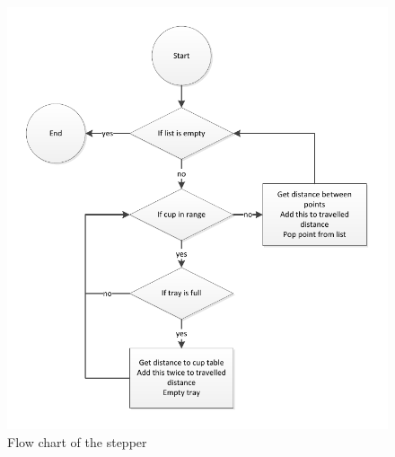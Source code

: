 \begin{figure}[htb]
	\centering
	\includegraphics[width=\textwidth,trim=0 0 0 0]{graphics/flowchart.pdf}
	\caption{Flow chart of the stepper}
	\label{fig:stepper}			
\end{figure}

